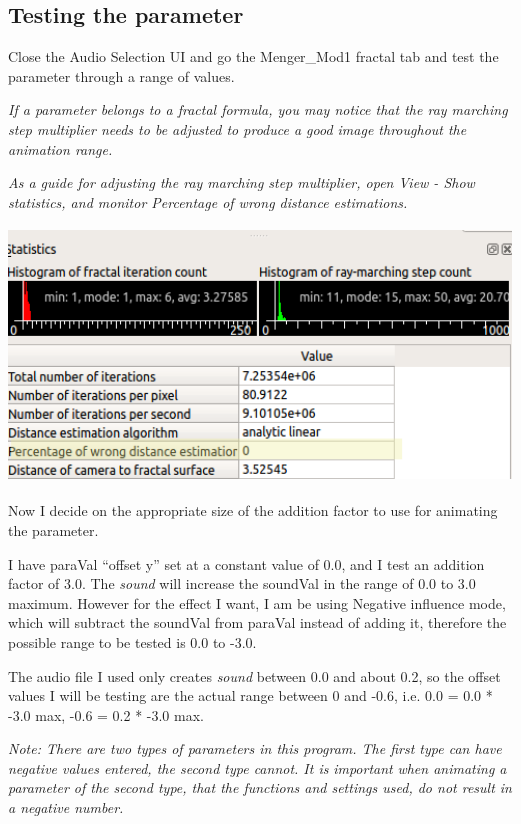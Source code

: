 \subsection{Testing the parameter}\label{testing-the-parameter}

Close the Audio Selection UI and go the Menger\_Mod1 fractal tab and
test the parameter through a range of values.

\emph{If a parameter belongs to a fractal formula, you may notice that
the ray marching step multiplier needs to be adjusted to produce a good
image throughout the animation range.}

\emph{As a guide for adjusting the ray marching step multiplier, open
View - Show statistics, and monitor Percentage of wrong distance
estimations.}

\includegraphics[width=5.40827in,height=2.67087in]{img/sound/media/image7.png}

Now I decide on the appropriate size of the addition factor to use for
animating the parameter.

I have paraVal ``offset y'' set at a constant value of 0.0, and I test
an addition factor of 3.0. The \emph{sound} will increase the soundVal
in the range of 0.0 to 3.0 maximum. However for the effect I want, I am
be using Negative influence mode, which will subtract the soundVal from
paraVal instead of adding it, therefore the possible range to be tested
is 0.0 to -3.0.

The audio file I used only creates \emph{sound} between 0.0 and about
0.2, so the offset values I will be testing are the actual range between
0 and -0.6, i.e. 0.0 = 0.0 * -3.0 max, -0.6 = 0.2 * -3.0 max.

\emph{Note: There are two types of parameters in this program. The first
type can have negative values entered, the second type cannot. It is}
\emph{important} \emph{when animating a parameter of the second type,
that the functions and settings used, do not result in a negative
number.}

